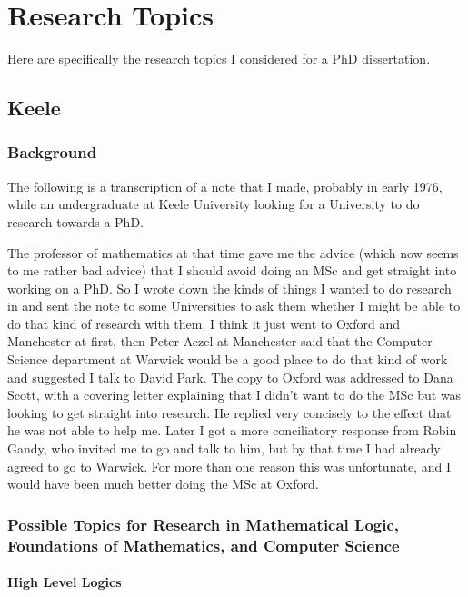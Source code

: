 \documentclass[10pt,titlepage]{book}
\begin{document}
\appendix

\chapter{Research Topics}\label{ResearchTopics}

Here are specifically the research topics I considered for a PhD dissertation.

\section{Keele}\label{KeeleProposal}

\subsection{Background}

The following is a transcription of a note that I made, probably in early 1976, while an undergraduate at Keele University looking for a University to do research towards a PhD.

The professor of mathematics at that time gave me the advice (which now seems to me rather bad advice) that I should avoid doing an MSc and get straight into working on a PhD.
So I wrote down the kinds of things I wanted to do research in and sent the note to some Universities to ask them whether I might be able to do that kind of research with them.
I think it just went to Oxford and Manchester at first, then Peter Aczel at Manchester said that the Computer Science department at Warwick would be a good place to do that kind of work and suggested I talk to David Park.
The copy to Oxford was addressed to Dana Scott, with a covering letter explaining that I didn't want to do the MSc but was looking to get straight into research.
He replied very concisely to the effect that he was not able to help me.
Later I got a more conciliatory response from Robin Gandy, who invited me to go and talk to him, but by that time I had already agreed to go to Warwick.
For more than one reason this was unfortunate, and I would have been much better doing the MSc at Oxford.

\subsection[Possible Topics for Research]{Possible Topics for Research in Mathematical Logic, Foundations of Mathematics, and Computer Science}

\subsubsection{High Level Logics}
\end{document}
